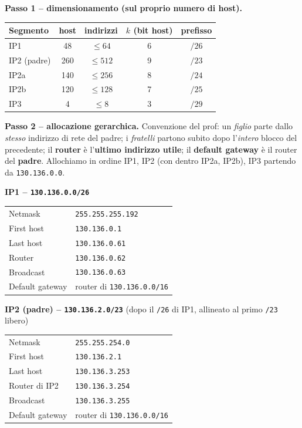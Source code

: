 \documentclass{report}
\begin{document}
\begin{solution}
\textbf{Passo 1 -- dimensionamento (sul proprio numero di host).}
\begin{center}
\begin{tabular}{lcccc}
\hline
Segmento & host & indirizzi & $k$ (bit host) & prefisso \\
\hline
IP1            & 48  & $\le 64$  & 6 & $/26$ \\
IP2 (padre)    & 260 & $\le 512$ & 9 & $/23$ \\
\quad IP2a     & 140 & $\le 256$ & 8 & $/24$ \\
\quad IP2b     & 120 & $\le 128$ & 7 & $/25$ \\
IP3            & 4   & $\le 8$   & 3 & $/29$ \\
\hline
\end{tabular}
\end{center}

\textbf{Passo 2 -- allocazione gerarchica.} Convenzione del prof: un
\emph{figlio} parte dallo \emph{stesso} indirizzo di rete del padre; i
\emph{fratelli} partono subito dopo l'\emph{intero} blocco del precedente;
il \textbf{router} è l'\textbf{ultimo indirizzo utile}; il \textbf{default
gateway} è il router del \textbf{padre}. Allochiamo in ordine IP1, IP2 (con
dentro IP2a, IP2b), IP3 partendo da \texttt{130.136.0.0}.

\medskip
\noindent\textbf{IP1 -- \texttt{130.136.0.0/26}}
\begin{center}
\begin{tabular}{ll}
\hline
Netmask & \texttt{255.255.255.192} \\
First host & \texttt{130.136.0.1} \\
Last host & \texttt{130.136.0.61} \\
Router & \texttt{130.136.0.62} \\
Broadcast & \texttt{130.136.0.63} \\
Default gateway & router di \texttt{130.136.0.0/16} \\
\hline
\end{tabular}
\end{center}

\noindent\textbf{IP2 (padre) -- \texttt{130.136.2.0/23}} \;(dopo il \texttt{/26}
di IP1, allineato al primo \texttt{/23} libero)
\begin{center}
\begin{tabular}{ll}
\hline
Netmask & \texttt{255.255.254.0} \\
First host & \texttt{130.136.2.1} \\
Last host & \texttt{130.136.3.253} \\
Router di IP2 & \texttt{130.136.3.254} \\
Broadcast & \texttt{130.136.3.255} \\
Default gateway & router di \texttt{130.136.0.0/16} \\
\hline
\end{tabular}
\end{center}


\end{solution}
\end{document}
